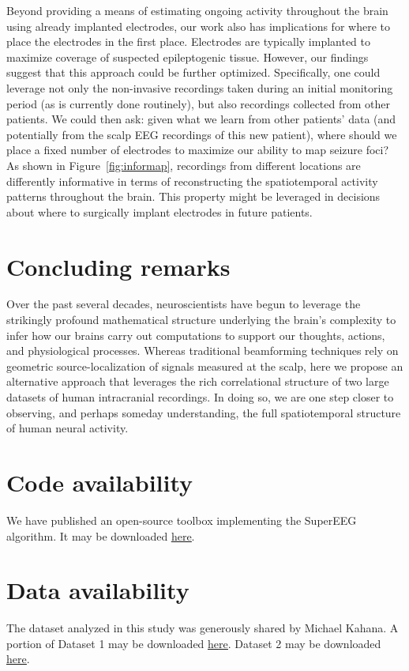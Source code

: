 \documentclass[11pt]{article}
\begin{document}
Beyond providing a means of estimating ongoing activity throughout the
brain using already implanted electrodes, our work also has
implications for where to place the electrodes in the first place.
Electrodes are typically implanted to maximize coverage of suspected
epileptogenic tissue.  However, our findings suggest that this
approach could be further optimized.  Specifically, one could leverage
not only the non-invasive recordings taken during an initial
monitoring period (as is currently done routinely), but also
recordings collected from other patients.  We could then ask: given
what we learn from other patients' data (and potentially from the
scalp EEG recordings of this new patient), where should we place a
fixed number of electrodes to maximize our ability to map seizure
foci?  As shown in Figure~\ref{fig:informap}, recordings from
different locations are differently informative in terms of
reconstructing the spatiotemporal activity patterns throughout the
brain.  This property might be leveraged in decisions about where to
surgically implant electrodes in future patients.

\section*{Concluding remarks}
Over the past several decades, neuroscientists have begun to leverage
the strikingly profound mathematical structure underlying the brain's
complexity to infer how our brains carry out computations to support
our thoughts, actions, and physiological processes.  Whereas
traditional beamforming techniques rely on geometric
source-localization of signals measured at the scalp, here we propose
an alternative approach that leverages the rich correlational
structure of two large datasets of human intracranial recordings.  In
doing so, we are one step closer to observing, and perhaps
someday understanding, the full spatiotemporal structure of human
neural activity.

\section*{Code availability}
We have published an open-source toolbox implementing the SuperEEG
algorithm.  It may be downloaded \href{https://supereeg.readthedocs.io/en/latest/}{\underline{here}}.

\section*{Data availability}
The dataset analyzed in this study was generously shared by Michael Kahana.  A portion of Dataset 1 may be downloaded
\href{http://memory.psych.upenn.edu/Request_EEG_access?paper=SedeEtal03}{\underline{here}}.
Dataset 2 may be downloaded
\href{http://memory.psych.upenn.edu/Request_EEG_access?paper=EzzyEtal17}{\underline{here}}.
\end{document}
